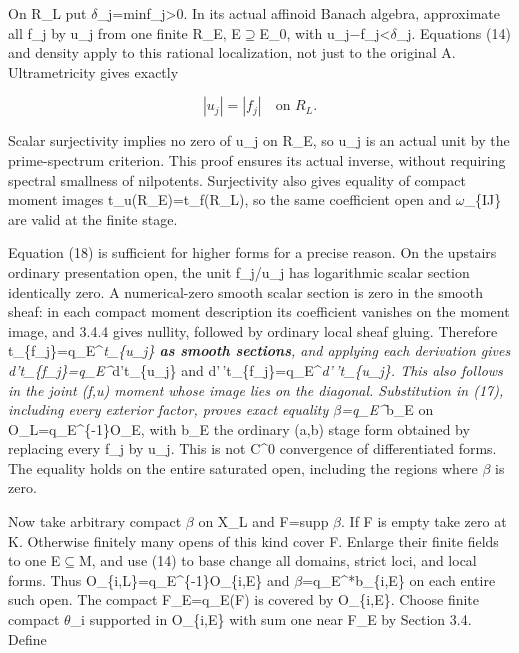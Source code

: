 \documentclass[
  10pt,
]{article}
\begin{document}
On R\_L put \ensuremath{\delta}\_j=min\textbar f\_j\textbar\textgreater0. In its actual
affinoid Banach algebra, approximate all f\_j by u\_j from one finite
R\_E, E\ensuremath{\supseteq}E\_0, with
\textbar\textbar u\_j\ensuremath{-}f\_j\textbar\textbar\textless \ensuremath{\delta}\_j. Equations (14)
and density apply to this rational localization, not just to the
original A. Ultrametricity gives exactly

\[
                      |u_j|=|f_j|\quad\text{on }R_L.        \tag{18}
\]

Scalar surjectivity implies no zero of u\_j on R\_E, so u\_j is an
actual unit by the prime-spectrum criterion. This proof ensures its
actual inverse, without requiring spectral smallness of nilpotents.
Surjectivity also gives equality of compact moment images
t\_u(R\_E)=t\_f(R\_L), so the same coefficient open and \ensuremath{\omega}\_\{IJ\} are
valid at the finite stage.

Equation (18) is sufficient for higher forms for a precise reason. On
the upstairs ordinary presentation open, the unit f\_j/u\_j has
logarithmic scalar section identically zero. A numerical-zero smooth
scalar section is zero in the smooth sheaf: in each compact moment
description its coefficient vanishes on the moment image, and 3.4.4
gives nullity, followed by ordinary local sheaf gluing. Therefore
t\_\{f\_j\}=q\_E\^{}\emph{t\_\{u\_j\} \textbf{as smooth sections}, and
applying each derivation gives d't\_\{f\_j\}=q\_E\^{}}d't\_\{u\_j\} and
d'\,'t\_\{f\_j\}=q\_E\^{}\emph{d'\,'t\_\{u\_j\}. This also follows in
the joint (f,u) moment whose image lies on the diagonal. Substitution in
(17), including every exterior factor, proves exact equality
\ensuremath{\beta}=q\_E\^{}}b\_E on O\_L=q\_E\^{}\{-1\}O\_E, with b\_E the ordinary (a,b)
stage form obtained by replacing every f\_j by u\_j. This is not C\^{}0
convergence of differentiated forms. The equality holds on the entire
saturated open, including the regions where \ensuremath{\beta} is zero.

Now take arbitrary compact \ensuremath{\beta} on X\_L and F=supp \ensuremath{\beta}. If F is empty take
zero at K. Otherwise finitely many opens of this kind cover F. Enlarge
their finite fields to one E\ensuremath{\subseteq}M, and use (14) to base change all domains,
strict loci, and local forms. Thus O\_\{i,L\}=q\_E\^{}\{-1\}O\_\{i,E\}
and \ensuremath{\beta}=q\_E\^{}*b\_\{i,E\} on each entire such open. The compact
F\_E=q\_E(F) is covered by O\_\{i,E\}. Choose finite compact \ensuremath{\theta}\_i
supported in O\_\{i,E\} with sum one near F\_E by Section 3.4. Define
\end{document}
